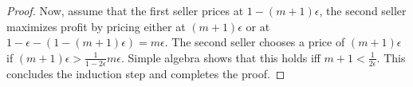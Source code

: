 \begin{proof}
	Now, assume that the first seller prices at  $1-(m+1)\epsilon$,
the second seller maximizes profit by pricing either at $(m+1)\epsilon$  or at $1-\epsilon-(1-(m+1)\epsilon)=m\epsilon$.
The second seller chooses a price of $(m+1)\epsilon$ if
$(m+1)\epsilon > \frac{1}{1-2\epsilon}m\epsilon$.
Simple algebra shows that this holds iff $m+1<\frac{1}{2\epsilon}$.
This concludes the induction step and completes the proof.
%	
%	
%	
%	
%	
\end{proof}


